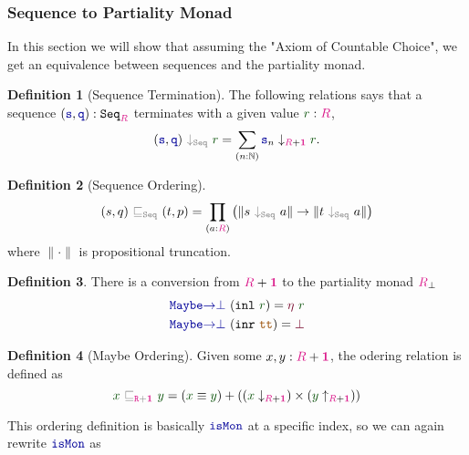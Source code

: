 \documentclass[twoside,11pt,openright]{report}
\theoremstyle{plain} %
\theoremstyle{definition}
\newtheorem{defn}{Definition}[section]
\theoremstyle{remark}
\newcommand*{\term}[1]{\textcolor{green!30!black}{#1}} %
\newcommand*{\type}[1]{\textcolor{magenta!90!black}{#1}}
\newcommand*{\unit}{\type{\textbf{1}}}
\newcommand*{\relation}[1]{\textcolor{gray}{\ensuremath{\mathtt{#1}}}}
\newcommand*{\constant}[1]{\textcolor{orange!60!black}{\ensuremath{\mathtt{#1}}}}
\newcommand*{\function}[1]{\textcolor{blue!60!black}{\ensuremath{\mathtt{#1}}}}
\newcommand*{\constructor}[1]{\textcolor{purple!60!black}{\ensuremath{\mathtt{#1}}}}
\newcommand*{\typeformer}[1]{\ensuremath{\mathtt{#1}}}
\begin{document}
\subsubsection{Sequence to Partiality Monad}
In this section we will show that assuming the "Axiom of Countable Choice", we get an equivalence between sequences and the partiality monad.
\begin{defn}[Sequence Termination]
  The following relations says that a sequence \((\function{s},\function{q}) : \typeformer{Seq}_{\type{R}}\) terminates with a given value \(\term{r} : \type{R}\),
  \begin{equation}
    (\function{s},\function{q})~\relation{\downarrow_{\mathtt{Seq}}}~\term{r} = \sum_{(n : \mathbb{N})} \function{s}_n \downarrow_{\type{R} + \unit} \term{r}.
  \end{equation}
\end{defn}
\begin{defn}[Sequence Ordering]
\begin{equation}
  (s,q)~\relation{\sqsubseteq_{\mathtt{Seq}}}~(t,p) = \prod_{(a : \type{R})} \left(\|s~\relation{\downarrow_{\mathtt{Seq}}}~a\| \rightarrow \| t~\relation{\downarrow_{\mathtt{Seq}}}~a\|\right)
\end{equation}
where \(\| \cdot \|\) is propositional  truncation.
\end{defn}
\begin{defn} There is a conversion from \(\type{R} + \unit\) to the partiality monad \(\type{R}_\bot\)
  \begin{equation}
    \begin{aligned}
      &\function{Maybe{\rightarrow}\bot}~(\mathtt{inl}~\term{r}) = \constructor{\eta}~\term{r} \\
      &\function{Maybe{\rightarrow}\bot}~(\mathtt{inr}~\constant{tt}) = \constructor{\bot}
    \end{aligned}
  \end{equation}
\end{defn}
\begin{defn}[Maybe Ordering] Given some \(x,y : \type{R} + \unit\), the odering relation is defined as
\begin{equation}
  \term{x}~\relation{\sqsubseteq_{\type{R} + \unit}}~\term{y} = (\term{x} \equiv \term{y}) + ((\term{x}  \downarrow_{\type{R} + \unit}) \times (\term{y} \uparrow_{\type{R} + \unit}))
\end{equation}
\end{defn}
\noindent This ordering definition is basically \(\function{isMon}\) at a specific index, so we can again rewrite \(\function{isMon}\) as
\end{document}
